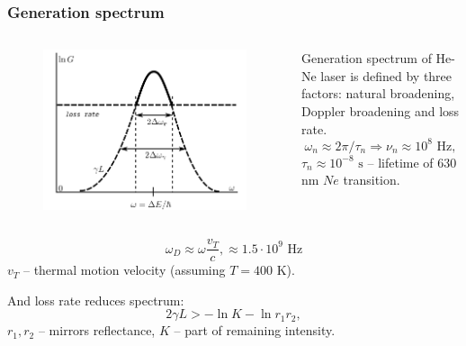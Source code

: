 \documentclass{beamer}
\begin{document}
	\begin{frame}
		\frametitle{Generation spectrum}
		
		\begin{columns}
			\begin{figure}
				\centering
				\includegraphics[width=1\linewidth]{res/generation_spectrum.png}
			\end{figure}
			Generation spectrum of He-Ne laser is defined by three factors: natural broadening, Doppler broadening and loss rate.
			$$ \omega_n \approx 2 \pi / \tau_n \Rightarrow \nu_n \approx10^{8} \text{ Hz} , $$
			$\tau_n \approx 10^{-8} \text{ s}$ -- lifetime of $630$ nm  $Ne$ transition.
		\end{columns}
				
		$$ \omega_D \approx \omega \frac{v_T}{c}, \approx 1.5 \cdot 10^9 \text{ Hz}$$
		$v_T$ -- thermal motion velocity (assuming $T = 400$ K).
		
		And loss rate reduces spectrum:
		$$ 2 \gamma L > - \ln{K} - \ln{r_1 r_2}, $$
		$r_1, r_2$ -- mirrors reflectance, $K$ -- part of remaining intensity.
	\end{frame}
	
\end{document}
